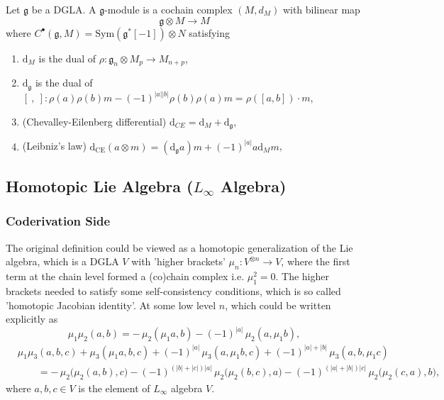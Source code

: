 \documentclass[10pt]{article}
\begin{document}
\begin{definition}
  Let $\mathfrak{g}$ be a DGLA. A $\mathfrak{g}$-module is a cochain complex $(M, d_M)$ with bilinear map
  \begin{equation*}
    \mathfrak{g} \otimes M \rightarrow M
  \end{equation*}
  where $ C^{\bullet}(\mathfrak{g}, M) = \mathrm{Sym}\left( \mathfrak{g}^{*}[-1] \right) \otimes N$ satisfying
  \begin{enumerate}[(1)]
    \item $ \mathrm{d} _{M}$ is the dual of $\rho: \mathfrak{g}_n \otimes M_p \rightarrow M_{n+p}$,
    \item $ \mathrm{d} _{\mathfrak{g}}$ is the dual of $[~,~]: \rho(a) \rho(b) m - (-1)^{|a||b|} \rho(b) \rho(a) m = \rho([a, b]) \cdot m$,
    \item (Chevalley-Eilenberg differential) $ \mathrm{d} _{CE} = \mathrm{d} _{M} + \mathrm{d} _{\mathfrak{g}}$,
    \item (Leibniz's law) $\mathrm{d}_\mathrm{CE}(a \otimes m) = (\mathrm{d}_{\mathfrak{g}} a) m + (-1)^{|a|} a \mathrm{d}_M m$,
  \end{enumerate}
\end{definition}

\subsection{\texorpdfstring{Homotopic Lie Algebra ($L_{\infty}$ Algebra)}{ Homotopic Lie Algebra (L-infinity Algebra)}}

\subsubsection{Coderivation Side}

The original definition could be viewed as a homotopic generalization of the Lie algebra, which is a DGLA $ V$  with 'higher brackets' $ \mu_{n}: V^{\otimes n} \rightarrow V$, where the first term at the chain level formed a (co)chain complex i.e. $ \mu_1^{2} = 0$.
The higher brackets needed to satisfy some self-consistency conditions, which is so called 'homotopic Jacobian identity'.
At some low level $ n$, which could be written explicitly as
\begin{equation*}
  \mu_1 \mu_2(a,b)
  = -\,\mu_2(\mu_1 a, b)-(-1)^{|a|}\,\mu_2(a, \mu_1 b),
\end{equation*}
\begin{equation*}
  \begin{aligned}
    &\mu_1 \mu_3(a,b,c)
    + \mu_3(\mu_1 a, b, c)
    + (-1)^{|a|}\,\mu_3(a, \mu_1 b, c)
    + (-1)^{|a|+|b|}\,\mu_3(a, b, \mu_1 c)\\
    &\qquad
    = -\,\mu_2\bigl(\mu_2(a,b),c\bigr)
    - (-1)^{(|b|+|c|)|a|}\,\mu_2\bigl(\mu_2(b,c),a\bigr)
    - (-1)^{(|a|+|b|)|c|}\,\mu_2\bigl(\mu_2(c,a),b\bigr),
  \end{aligned}
\end{equation*}
where $ a, b, c \in V$ is the element of $ L_\infty$ algebra $ V$.
\end{document}
